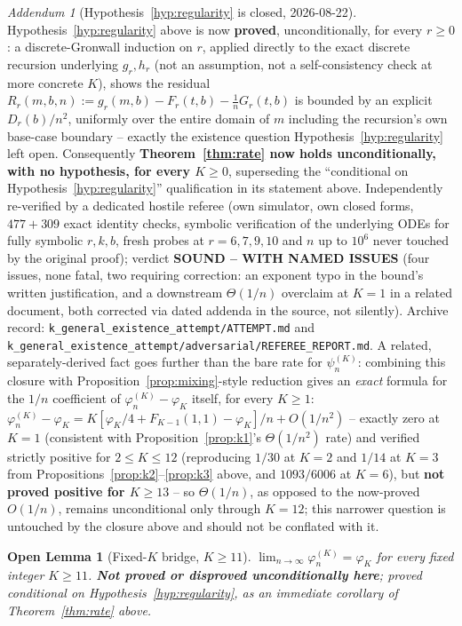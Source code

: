 \documentclass[11pt]{article}
\newtheorem*{openlemma}{Open Lemma}
\theoremstyle{remark}
\newtheorem{addendum}{Addendum}
\begin{document}
\begin{addendum}[Hypothesis~\ref{hyp:regularity} is closed, 2026-08-22]
\label{add:closure}
Hypothesis~\ref{hyp:regularity} above is now \textbf{proved},
unconditionally, for every $r\ge0$: a discrete-Gronwall induction on
$r$, applied directly to the exact discrete recursion underlying
$g_r,h_r$ (not an assumption, not a self-consistency check at more
concrete $K$), shows the residual
$R_r(m,b,n):=g_r(m,b)-F_r(t,b)-\tfrac1nG_r(t,b)$ is bounded by an
explicit $D_r(b)/n^2$, uniformly over the entire domain of $m$
including the recursion's own base-case boundary -- exactly the
existence question Hypothesis~\ref{hyp:regularity} left open.
Consequently \textbf{Theorem~\ref{thm:rate} now holds unconditionally,
with no hypothesis, for every $K\ge0$}, superseding the ``conditional
on Hypothesis~\ref{hyp:regularity}'' qualification in its statement
above. Independently re-verified by a dedicated hostile referee (own
simulator, own closed forms, $477+309$ exact identity checks, symbolic
verification of the underlying ODEs for fully symbolic $r,k,b$, fresh
probes at $r=6,7,9,10$ and $n$ up to $10^6$ never touched by the
original proof); verdict \textbf{SOUND -- WITH NAMED ISSUES} (four
issues, none fatal, two requiring correction: an exponent typo in the
bound's written justification, and a downstream $\Theta(1/n)$ overclaim
at $K=1$ in a related document, both corrected via dated addenda in the
source, not silently). Archive record:
\texttt{k\_general\_existence\_attempt/ATTEMPT.md} and
\texttt{k\_general\_existence\_attempt/adversarial/REFEREE\_REPORT.md}.
A related, separately-derived fact goes further than the bare rate for
$\psi_n^{(K)}$: combining this closure with Proposition~\ref{prop:mixing}-style
reduction gives an \emph{exact} formula for the $1/n$ coefficient of
$\varphi_n^{(K)}-\varphi_K$ itself, for every $K\ge1$:
$\varphi_n^{(K)}-\varphi_K = K[\varphi_K/4+F_{K-1}(1,1)-\varphi_K]/n +
O(1/n^2)$ -- exactly zero at $K=1$ (consistent with
Proposition~\ref{prop:k1}'s $\Theta(1/n^2)$ rate) and verified strictly
positive for $2\le K\le12$ (reproducing $1/30$ at $K=2$ and $1/14$ at
$K=3$ from Propositions~\ref{prop:k2}--\ref{prop:k3} above, and
$1093/6006$ at $K=6$), but \textbf{not proved positive for $K\ge13$} --
so $\Theta(1/n)$, as opposed to the now-proved $O(1/n)$, remains
unconditional only through $K=12$; this narrower question is untouched
by the closure above and should not be conflated with it.
\end{addendum}

\begin{openlemma}[Fixed-$K$ bridge, $K\ge11$]
\label{ol:k11}
$\displaystyle\lim_{n\to\infty}\varphi_n^{(K)} = \varphi_K$ for every
fixed integer $K\ge11$. \textbf{Not proved or disproved unconditionally
here}; proved conditional on Hypothesis~\ref{hyp:regularity}, as an
immediate corollary of Theorem~\ref{thm:rate} above.
\end{openlemma}
\end{document}
